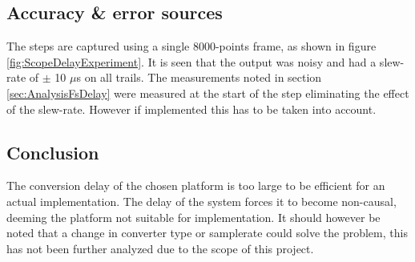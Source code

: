 \subsection{Accuracy \& error sources}

The steps are captured using a single 8000-points frame, as shown in figure \ref{fig:ScopeDelayExperiment}. It is seen that the output was noisy and had a slew-rate of $\pm$ 10 $\mu $s on all trails. The measurements noted in section \ref{sec:AnalysisFsDelay} were measured at the start of the step eliminating the effect of the slew-rate. However if implemented this has to be taken into account.

\subsection{Conclusion}
The conversion delay of the chosen platform is too large to be efficient for an actual implementation. The delay of the system forces it to become non-causal, deeming the platform not suitable for implementation. It should however be noted that a change in converter type or samplerate could solve the problem, this has not been further analyzed due to the scope of this project.



